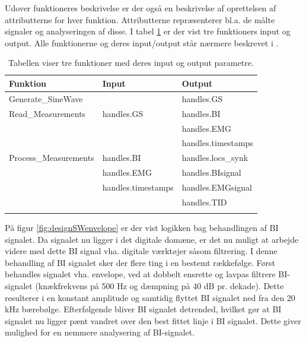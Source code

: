 Udover funktioneres beskrivelse er der også en beskrivelse af oprettelsen af attributterne for hver funktion. Attributterne repræsenterer bl.a. de målte signaler og analyseringen af disse. I tabel \ref{tab:SWinputoutput} er der vist tre funktioners input og output. Alle funktionerne og deres input/output står nærmere beskrevet i .


\begin{table}[H]
\center
\begin{tabularx}{\linewidth}{l  X  X}
     \textbf{Funktion}	&	\textbf{Input}		&	\textbf{Output} \\ \midrule
     Generate\_SineWave   	&		&	handles.GS\\   \addlinespace[2mm]\hline\addlinespace[2mm]
Read\_Measurements	&	handles.GS	&	handles.BI\\   \addlinespace[2mm]
			    &		&	handles.EMG\\   \addlinespace[2mm]
			    &		&	handles.timestamps\\   \addlinespace[2mm]\hline\addlinespace[2mm]
			    Process\_Measurements    &	handles.BI	&	handles.locs\_synk\\   \addlinespace[2mm]
						&	handles.EMG	&	handles.BIsignal\\   \addlinespace[2mm]
						&	handles.timestamps	&	handles.EMGsignal\\   \addlinespace[2mm]
						&	& handles.TID	\\   \addlinespace[2mm]\hline\addlinespace[2mm]
						 \bottomrule                                                                                                                   
    \end{tabularx}
    \caption {Tabellen viser tre funktioner med deres input og output parametre.}
    \label{tab:SWinputoutput}
	
\end{table}

På figur \ref{fig:designSWenvelope} er der vist logikken bag behandlingen af BI signalet. Da signalet nu ligger i det digitale domæne, er det nu muligt at arbejde videre med dette BI signal vha. digitale værktøjer såsom filtrering. I denne behandling af BI signalet sker der flere ting i en bestemt rækkefølge. Først behandles signalet vha. envelope, ved at dobbelt ensrette og lavpas filtrere BI-signalet (knækfrekvens på 500 Hz og dæmpning på 40 dB pr. dekade). Dette resulterer i en konstant amplitude og samtidig flyttet BI signalet ned fra den 20 kHz bærebølge. Efterfølgende bliver BI signalet detrended, hvilket gør at BI signalet nu ligger pænt vandret over den best fittet linje i BI signalet. Dette giver mulighed for en nemmere analysering af BI-signalet. 

